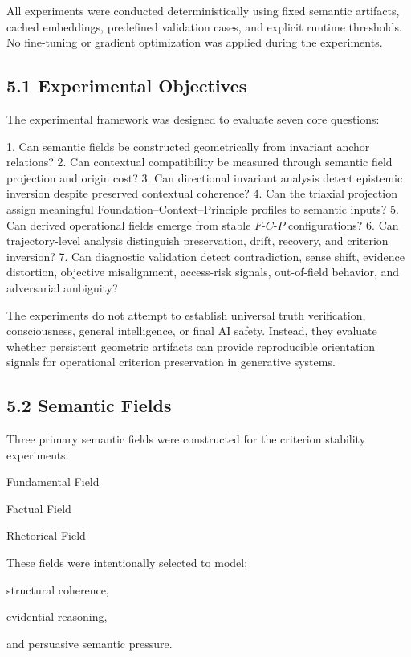 \documentclass[11pt]{article}
\begin{document}
All experiments were conducted deterministically using fixed semantic artifacts, cached embeddings, predefined validation cases, and explicit runtime thresholds. No fine-tuning or gradient optimization was applied during the experiments.

\subsection{5.1 Experimental Objectives}

The experimental framework was designed to evaluate seven core questions:

1. Can semantic fields be constructed geometrically from invariant anchor relations?
2. Can contextual compatibility be measured through semantic field projection and origin cost?
3. Can directional invariant analysis detect epistemic inversion despite preserved contextual coherence?
4. Can the triaxial projection assign meaningful Foundation--Context--Principle profiles to semantic inputs?
5. Can derived operational fields emerge from stable $F$-$C$-$P$ configurations?
6. Can trajectory-level analysis distinguish preservation, drift, recovery, and criterion inversion?
7. Can diagnostic validation detect contradiction, sense shift, evidence distortion, objective misalignment, access-risk signals, out-of-field behavior, and adversarial ambiguity?

The experiments do not attempt to establish universal truth verification, consciousness, general intelligence, or final AI safety. Instead, they evaluate whether persistent geometric artifacts can provide reproducible orientation signals for operational criterion preservation in generative systems.

\subsection{5.2 Semantic Fields}

Three primary semantic fields were constructed for the criterion stability experiments:

Fundamental Field

Factual Field

Rhetorical Field

These fields were intentionally selected to model:

structural coherence,

evidential reasoning,

and persuasive semantic pressure.
\end{document}
